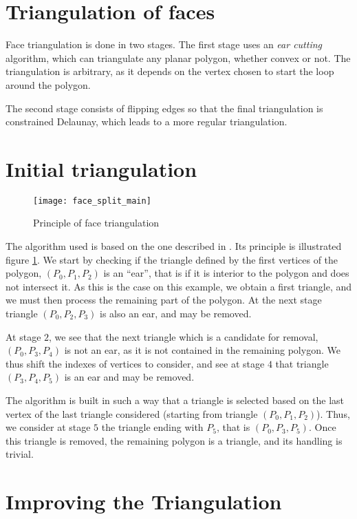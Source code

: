 \section*{Triangulation of faces\label{sec:triangle}}

Face triangulation is done in two
stages. The first stage uses an \emph{ear cutting} algorithm, which
can triangulate any planar polygon, whether convex or not.
The triangulation is arbitrary, as it depends on the vertex chosen
to start the loop around the polygon.

The second stage consists of flipping edges so that the final
triangulation is constrained Delaunay, which leads to a
more regular triangulation.

\section*{Initial triangulation\label{sec:triangle_ini}}

\begin{figure}[!h]
\centerline{
\texttt{[image: face\_split\_main]}}
\caption{Principle of face triangulation}
\label{fig:algo.ear_splitting}
\end{figure}

The algorithm used is based on the one described in \cite{Theussl:1998}.
Its principle is illustrated figure \ref{fig:algo.ear_splitting}.
We start by checking if the triangle defined by the first vertices
of the polygon, $(P_0, P_1, P_2)$ is an ``ear'', that is if it is
interior to the polygon and does not intersect it. As this is the case
on this example, we obtain a first triangle, and we must then process
the remaining part of the polygon. At the next stage triangle
$(P_0, P_2, P_3)$ is also an ear, and may be removed.

At stage $2$, we see that the next triangle which is a candidate for
removal, $(P_0, P_3, P_4)$ is not an ear, as it is not contained in the
remaining polygon. We thus shift the indexes of vertices to consider,
and see at stage $4$ that triangle $(P_3, P_4, P_5)$
is an ear and may be removed.

The algorithm is built in such a way that a triangle is selected based on
the last vertex of the last triangle considered (starting from triangle
$(P_0, P_1, P_2)$). Thus, we consider at stage $5$ the triangle ending
with $P_5$, that is $(P_0, P_3, P_5)$.
Once this triangle is removed, the remaining polygon is a triangle,
and its handling is trivial.

\section*{Improving the Triangulation\label{sec:triangle_delaunay}}

